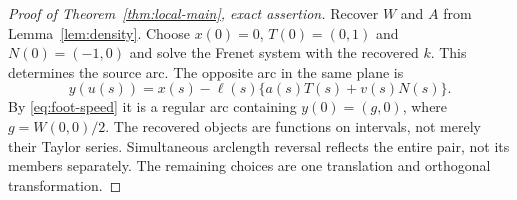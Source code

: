 \begin{proof}[Proof of Theorem~\ref{thm:local-main}, exact assertion]
Recover $W$ and $A$ from Lemma~\ref{lem:density}. Choose
$x(0)=0$, $T(0)=(0,1)$ and $N(0)=(-1,0)$ and solve the Frenet
system with the recovered $k$. This determines the source arc. The
opposite arc in the same plane is
\begin{equation}\label{eq:foot}
 y(u(s))=x(s)-\ell(s)\{a(s)T(s)+v(s)N(s)\}.
\end{equation}
By \eqref{eq:foot-speed} it is a regular arc containing
$y(0)=(g,0)$, where $g=W(0,0)/2$. The recovered objects are functions
on intervals, not merely their Taylor series. Simultaneous arclength
reversal reflects the entire pair, not its members separately. The
remaining choices are one translation and orthogonal transformation.
\end{proof}

